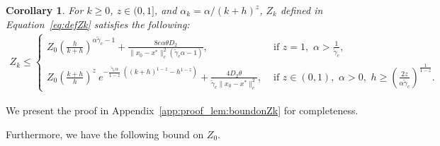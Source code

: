 \documentclass{article}
\newcommand{\lrp}[1]{\left( #1 \right)}
\newtheorem{corollary}{Corollary}[theorem]
\begin{document}
\begin{corollary}\label{lem:boundonZk}
    For $k\ge 0$, $z\in(0,1]$, and  $\alpha_k = \alpha/(k+h)^z$, $Z_k$ defined in Equation~\eqref{eq:defZk} satisfies the following:  
\begin{align*}
    Z_k \le 
    \begin{cases}
        Z_0\lrp{ \frac{h}{k+h} }^{\alpha\tilde{\gamma}_c - 1} + \frac{8 e \alpha\theta D_2 }{\|x_0-x^*\|^2_c \lrp{\tilde{\gamma}_c\alpha - 1} }, & \text{ if } z = 1,\,\, \alpha > \frac{1}{\tilde{\gamma}_c},\\
        Z_0\lrp{ \frac{k+h}{h} }^z ~ e^{-\frac{\tilde{\gamma}_c\alpha}{1-z}~\lrp{(k+h)^{1-z} - h^{1-z}} } +  \frac{4 D_2\theta}{\tilde{\gamma}_c\|x_0-x^*\|^2_c  }, & \text{ if } z\in (0,1), \,\, \alpha > 0, \,\, h \ge \lrp{\frac{2z}{\alpha\tilde{\gamma}_c}}^\frac{1}{1-z}.
    \end{cases}
\end{align*}
\end{corollary}
We present the proof in Appendix~\ref{app:proof_lem:boundonZk} for completeness. 

\smallskip

\noindent Furthermore, we have the following bound on $Z_0$. 
\end{document}
